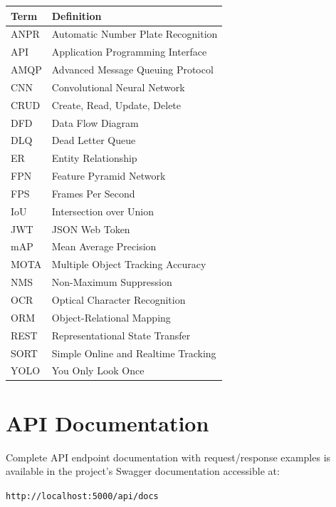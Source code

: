 \documentclass[12pt,a4paper]{report}
\begin{document}
\begin{table}[H]
\centering
\begin{tabular}{|l|l|}
\hline
\textbf{Term} & \textbf{Definition} \\
\hline
ANPR & Automatic Number Plate Recognition \\
\hline
API & Application Programming Interface \\
\hline
AMQP & Advanced Message Queuing Protocol \\
\hline
CNN & Convolutional Neural Network \\
\hline
CRUD & Create, Read, Update, Delete \\
\hline
DFD & Data Flow Diagram \\
\hline
DLQ & Dead Letter Queue \\
\hline
ER & Entity Relationship \\
\hline
FPN & Feature Pyramid Network \\
\hline
FPS & Frames Per Second \\
\hline
IoU & Intersection over Union \\
\hline
JWT & JSON Web Token \\
\hline
mAP & Mean Average Precision \\
\hline
MOTA & Multiple Object Tracking Accuracy \\
\hline
NMS & Non-Maximum Suppression \\
\hline
OCR & Optical Character Recognition \\
\hline
ORM & Object-Relational Mapping \\
\hline
REST & Representational State Transfer \\
\hline
SORT & Simple Online and Realtime Tracking \\
\hline
YOLO & You Only Look Once \\
\hline
\end{tabular}
\end{table}

\chapter{API Documentation}

Complete API endpoint documentation with request/response examples is available in the project's Swagger documentation accessible at:

\texttt{http://localhost:5000/api/docs}
\end{document}
